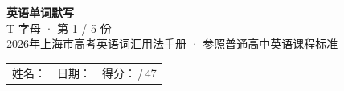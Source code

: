 \documentclass[10pt,a4paper]{article}
\begin{document}
\pagestyle{plain}

\begin{center}
{\LARGE\bfseries 英语单词默写}\\[0.22em]
{\large T 字母 · 第 1 / 5 份}\\[0.18em]
{\small 2026年上海市高考英语词汇用法手册 · 参照普通高中英语课程标准}
\end{center}

\vspace{0.25em}
\noindent\begin{tabular}{@{}p{}@{}p{}@{}p{}@{}}
姓名：\underline{\hspace{2.0cm}} & 日期：\underline{\hspace{2.0cm}} & 得分：\underline{\hspace{1.3cm}}\,/\,47 \\
\end{tabular}

\vspace{0.3em}

\vspace{0.08em}
\end{document}
